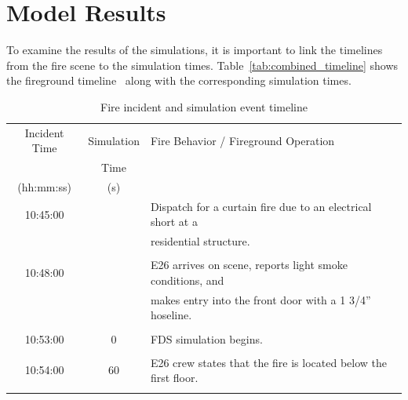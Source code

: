 \documentclass[12pt,oneside]{book}
\begin{document}
\chapter{Model Results}
\label{sec:model_results}

To examine the results of the simulations, it is important to link the timelines from the fire scene to the simulation times. Table~\ref{tab:combined_timeline} shows the fireground timeline~\cite{NIOSH:Bowyer2} along with the corresponding simulation times.

\begin{table}[!ht]
\caption[Fire incident and simulation event timeline]{Fire incident and simulation event timeline}
\begin{tabular}{ccl}
\toprule
Incident Time  &  Simulation  &  Fire Behavior / Fireground Operation                             \\
               &  Time        &                                                                   \\
{(hh:mm:ss)}   &  {(s)}       &                                                                   \\
\midrule
10:45:00       &              &  Dispatch for a curtain fire due to an electrical short at a      \\
               &              &  residential structure.                                           \\
               &              &                                                                   \\
10:48:00       &              &  E26 arrives on scene, reports light smoke conditions, and        \\
               &              &  makes entry into the front door with a 1 3/4'' hoseline.         \\
               &              &                                                                   \\
10:53:00       &  0           &  FDS simulation begins.                                           \\
               &              &                                                                   \\
10:54:00       &  60          &  E26 crew states that the fire is located below the first floor.  \\
               &              &                                                                   \\

\end{tabular}
\end{table}
\end{document}
